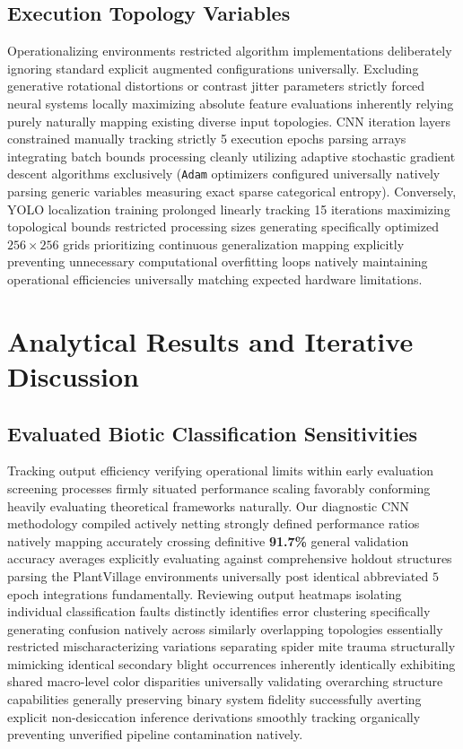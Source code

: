\documentclass[conference]{IEEEtran}
\begin{document}
\subsection{Execution Topology Variables}
Operationalizing environments restricted algorithm implementations deliberately ignoring standard explicit augmented configurations universally. Excluding generative rotational distortions or contrast jitter parameters strictly forced neural systems locally maximizing absolute feature evaluations inherently relying purely naturally mapping existing diverse input topologies. CNN iteration layers constrained manually tracking strictly 5 execution epochs parsing arrays integrating batch bounds processing cleanly utilizing adaptive stochastic gradient descent algorithms exclusively (\texttt{Adam} optimizers configured universally natively parsing generic variables measuring exact sparse categorical entropy). Conversely, YOLO localization training prolonged linearly tracking 15 iterations maximizing topological bounds restricted processing sizes generating specifically optimized $256 \times 256$ grids prioritizing continuous generalization mapping explicitly preventing unnecessary computational overfitting loops natively maintaining operational efficiencies universally matching expected hardware limitations.

\section{Analytical Results and Iterative Discussion}

\subsection{Evaluated Biotic Classification Sensitivities}
Tracking output efficiency verifying operational limits within early evaluation screening processes firmly situated performance scaling favorably conforming heavily evaluating theoretical frameworks naturally. Our diagnostic CNN methodology compiled actively netting strongly defined performance ratios natively mapping accurately crossing definitive \textbf{91.7\%} general validation accuracy averages explicitly evaluating against comprehensive holdout structures parsing the PlantVillage environments universally post identical abbreviated $5$ epoch integrations fundamentally. Reviewing output heatmaps isolating individual classification faults distinctly identifies error clustering specifically generating confusion natively across similarly overlapping topologies essentially restricted mischaracterizing variations separating spider mite trauma structurally mimicking identical secondary blight occurrences inherently identically exhibiting shared macro-level color disparities universally validating overarching structure capabilities generally preserving binary system fidelity successfully averting explicit non-desiccation inference derivations smoothly tracking organically preventing unverified pipeline contamination natively.
\end{document}
